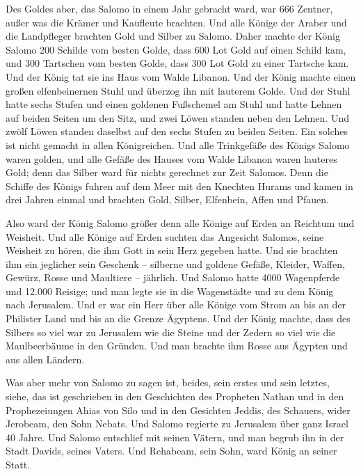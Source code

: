  Des Goldes aber, das Salomo in einem Jahr gebracht ward,
war 666 Zentner,  außer was die Krämer und Kaufleute
brachten. Und alle Könige der Araber und die Landpfleger brachten Gold
und Silber zu Salomo.  Daher machte der König Salomo 200
Schilde vom besten Golde, dass 600 Lot Gold auf einen Schild kam,
 und 300 Tartschen vom besten Golde, dass 300 Lot Gold zu
einer Tartsche kam.  Und der König tat sie ins Haus vom
Walde Libanon. Und der König machte einen großen elfenbeinernen Stuhl
und überzog ihn mit lauterem Golde.  Und der Stuhl hatte
sechs Stufen und einen goldenen Fußschemel am Stuhl und hatte Lehnen auf
beiden Seiten um den Sitz, und zwei Löwen standen neben den Lehnen.
 Und zwölf Löwen standen daselbst auf den sechs Stufen zu
beiden Seiten. Ein solches ist nicht gemacht in allen Königreichen.
 Und alle Trinkgefäße des Königs Salomo waren golden, und
alle Gefäße des Hauses vom Walde Libanon waren lauteres Gold; denn das
Silber ward für nichts gerechnet zur Zeit Salomos.  Denn
die Schiffe des Königs fuhren auf dem Meer mit den Knechten Hurams und
kamen in drei Jahren einmal und brachten Gold, Silber, Elfenbein, Affen
und Pfauen.

 Also ward der König Salomo größer denn alle Könige auf
Erden an Reichtum und Weisheit.  Und alle Könige auf
Erden suchten das Angesicht Salomos, seine Weisheit zu hören, die ihm
Gott in sein Herz gegeben hatte.  Und sie brachten ihm
ein jeglicher sein Geschenk -- silberne und goldene Gefäße, Kleider,
Waffen, Gewürz, Rosse und Maultiere -- jährlich.  Und
Salomo hatte 4000 Wagenpferde und 12.000 Reisige; und man legte sie in
die Wagenstädte und zu dem König nach Jerusalem.  Und er
war ein Herr über alle Könige vom Strom an bis an der Philister Land und
bis an die Grenze Ägyptens.  Und der König machte, dass
des Silbers so viel war zu Jerusalem wie die Steine und der Zedern so
viel wie die Maulbeerbäume in den Gründen.  Und man
brachte ihm Rosse aus Ägypten und aus allen Ländern.

 Was aber mehr von Salomo zu sagen ist, beides, sein
erstes und sein letztes, siehe, das ist geschrieben in den Geschichten
des Propheten Nathan und in den Prophezeiungen Ahias von Silo und in den
Gesichten Jeddis, des Schauers, wider Jerobeam, den Sohn Nebats.
 Und Salomo regierte zu Jerusalem über ganz Israel 40
Jahre.  Und Salomo entschlief mit seinen Vätern, und man
begrub ihn in der Stadt Davids, seines Vaters. Und Rehabeam, sein Sohn,
ward König an seiner Statt.

